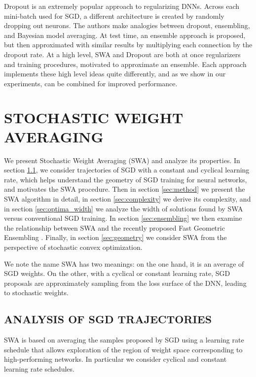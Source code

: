 \documentclass[letterpaper]{article}
\begin{document}
Dropout \citep{srivastava2014dropout} is an extremely popular approach
to regularizing DNNs.  Across each mini-batch used for SGD, a 
different architecture is created by randomly dropping out neurons. The 
authors make analogies between dropout, ensembling, and Bayesian 
model averaging.  At test time, an ensemble approach is proposed, but
then approximated with similar results by multiplying each connection
by the dropout rate.  At a high level, SWA and Dropout are both at once
regularizers and training procedures, motivated to approximate an ensemble.
Each approach implements these high level ideas quite differently, and as we 
show in our experiments, can be combined for improved performance.

\section{STOCHASTIC WEIGHT AVERAGING}

We present Stochastic Weight Averaging (SWA) and analyze its
properties. In section \ref{sec:motivation}, we consider trajectories
of SGD with a constant and cyclical learning rate, which helps understand
the geometry of SGD training for neural networks, and motivates the SWA 
procedure. Then in section \ref{sec:method} we present the SWA algorithm
in detail, in section \ref{sec:complexity} we derive its complexity, and in section
\ref{sec:optima_width} we analyze the width of solutions found by 
SWA versus conventional SGD training. In section \ref{sec:ensembling} 
we then examine the relationship between SWA and the recently proposed
Fast Geometric Ensembling \citep{garipov2018}. Finally, in section
\ref{sec:geometry} we consider SWA from the perspective of 
stochastic convex optimization.

We note the name SWA has two meanings: on the one hand, it is an average of 
SGD weights.  On the other, with a cyclical or constant learning rate, SGD 
proposals are approximately sampling from the loss surface of the DNN, 
leading to stochastic weights.

\subsection{ANALYSIS OF SGD TRAJECTORIES}
\label{sec:motivation}

SWA is based on averaging the samples proposed by SGD using a learning rate
schedule that allows exploration of the region of weight space corresponding
to high-performing networks. In particular we
consider cyclical and constant learning rate schedules.
\end{document}
